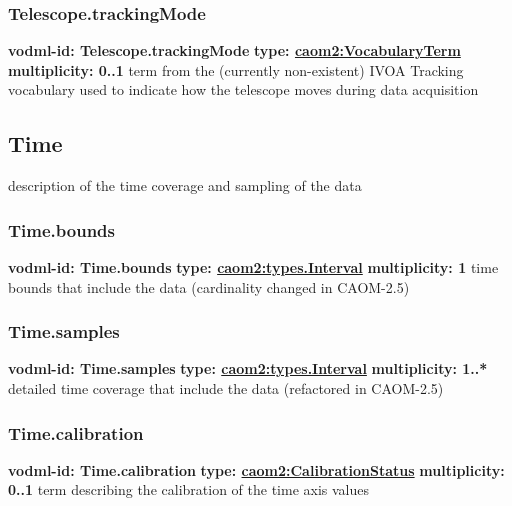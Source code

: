     \subsubsection{Telescope.trackingMode}
      \textbf{vodml-id: Telescope.trackingMode} \newline
      \textbf{type: \hyperref[sect:VocabularyTerm]{caom2:VocabularyTerm}} \newline
      \textbf{multiplicity: 0..1} \newline
      term from the (currently non-existent) IVOA Tracking vocabulary used to indicate how the telescope moves during data acquisition

  \subsection{Time}
  \label{sect:Time}
    description of the time coverage and sampling of the data

    \subsubsection{Time.bounds}
      \textbf{vodml-id: Time.bounds} \newline
      \textbf{type: \hyperref[sect:types.Interval]{caom2:types.Interval}} \newline
      \textbf{multiplicity: 1} \newline
      time bounds that include the data (cardinality changed in CAOM-2.5)

    \subsubsection{Time.samples}
      \textbf{vodml-id: Time.samples} \newline
      \textbf{type: \hyperref[sect:types.Interval]{caom2:types.Interval}} \newline
      \textbf{multiplicity: 1..*} \newline
      detailed time coverage that include the data (refactored in CAOM-2.5)

    \subsubsection{Time.calibration}
      \textbf{vodml-id: Time.calibration} \newline
      \textbf{type: \hyperref[sect:CalibrationStatus]{caom2:CalibrationStatus}} \newline
      \textbf{multiplicity: 0..1} \newline
      term describing the calibration of the time axis values

